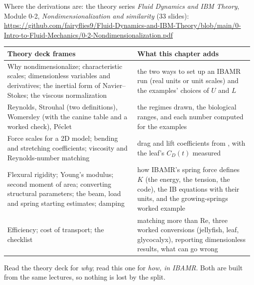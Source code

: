 \documentclass[aspectratio=169,11pt]{beamer}
\begin{document}
\begin{frame}{Where the derivations are: the theory series}
\label{fr:theory}
\small \emph{Fluid Dynamics and IBM Theory}, Module 0-2, \emph{Nondimensionalization and similarity} (33 slides): \url{https://github.com/fairyflies9/Fluid-Dynamics-and-IBM-Theory/blob/main/0-Intro-to-Fluid-Mechanics/0-2-Nondimensionalization.pdf}
\vspace{1mm}

\scriptsize
\begin{tabular}{@{}L{0.44\textwidth}L{0.46\textwidth}@{}}
\toprule
Theory deck frames & What this chapter adds\\
\midrule
Why nondimensionalize; characteristic scales; dimensionless variables and derivatives; the inertial form of Navier--Stokes; the viscous normalization & the two ways to set up an IBAMR run (real units or unit scales) and the examples' choices of $U$ and $L$\\
Reynolds, Strouhal (two definitions), Womersley (with the canine table and a worked check), P\'eclet & the regimes drawn, the biological ranges, and each number computed for the examples\\
Force scales for a 2D model; bending and stretching coefficients; viscosity and Reynolds-number matching & drag and lift coefficients from , with the leaf's $C_D(t)$ measured\\
Flexural rigidity; Young's modulus; second moment of area; converting structural parameters; the beam, load and spring starting estimates; damping & how IBAMR's spring force defines $K$ (the energy, the tension, the code), the IB equations with their units, and the growing-springs worked example\\
Efficiency; cost of transport; the checklist & matching more than Re, three worked conversions (jellyfish, leaf, glycocalyx), reporting dimensionless results, what can go wrong\\
\bottomrule
\end{tabular}

\vspace{2mm}
\small Read the theory deck for \emph{why}; read this one for \emph{how, in IBAMR}. Both are built from the same lectures, so nothing is lost by the split.
\end{frame}
\end{document}
